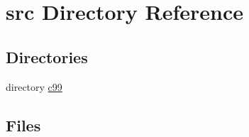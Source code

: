 \section{src Directory Reference}
\label{dir_68267d1309a1af8e8297ef4c3efbcdba}
\subsection*{Directories}
\begin{DoxyCompactItemize}
\item 
directory \hyperlink{dir_459143f1e15ecbef68a46e16acf20e36}{c99}
\end{DoxyCompactItemize}
\subsection*{Files}

